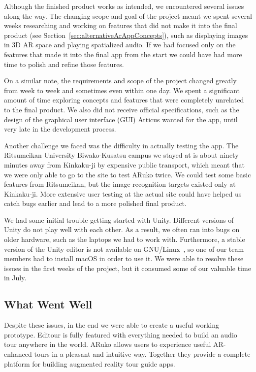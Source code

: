 \documentclass[a4paper, 10pt, american, titlepage]{article}
\begin{document}
Although the finished product works as intended, we encountered several issues
along the way. The changing scope and goal of the project meant we spent
several weeks researching and working on features that did not make it into the
final product (see Section~\ref{sec:alternativeArAppConcepts}), such as
displaying images in 3D AR space and playing spatialized audio. If we had
focused only on the features that made it into the final app from the start we
could have had more time to polish and refine those features.

On a similar note, the requirements and scope of the project changed greatly
from week to week and sometimes even within one day. We spent a significant
amount of time exploring concepts and features that were completely unrelated to
the final product. We also did not receive official specifications, such as the
design of the graphical user interface (GUI) Atticus wanted for the app, until
very late in the development process.

Another challenge we faced was the difficulty in actually testing the app. The
Ritsumeikan University Biwako-Kusatsu campus we stayed at is about ninety
minutes away from Kinkaku-ji by expensive public transport, which meant that we
were only able to go to the site to test ARuko twice. We could test some basic
features from Ritsumeikan, but the image recognition targets existed only at
Kinkaku-ji. More extensive user testing at the actual site could have helped us
catch bugs earlier and lead to a more polished final product.

We had some initial trouble getting started with Unity. Different versions of
Unity do not play well with each other. As a result, we often ran into bugs on
older hardware, such as the laptops we had to work with. Furthermore, a stable
version of the Unity editor is not available on GNU/Linux~\autocite{best2019},
so one of our team members had to install macOS in order to use it. We were able
to resolve these issues in the first weeks of the project, but it consumed some
of our valuable time in July.

\subsection{What Went Well}
\label{sec:whatWentWell}

Despite these issues, in the end we were able to create a useful working
prototype. Editour is fully featured with everything needed to build an
audio tour anywhere in the world. ARuko allows users to experience useful
AR-enhanced tours in a pleasant and intuitive way. Together they provide a
complete platform for building augmented reality tour guide apps.
\end{document}
